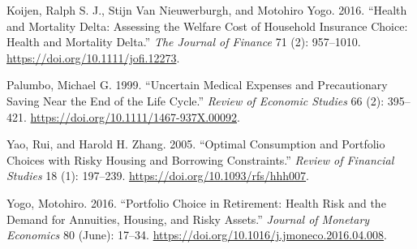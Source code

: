 \documentclass[
  12pt,
]{article}
\newlength{\cslhangindent}
\newlength{\cslentryspacingunit} %
\newenvironment{CSLReferences}[2] %
 {%
  \setlength{\parindent}{0pt}
  \ifodd #1
  \let\oldpar\par
  \def\par{\hangindent=\cslhangindent\oldpar}
  \fi
  \setlength{\parskip}{#2\cslentryspacingunit}
 }%
 {}
\begin{document}
\begin{CSLReferences}{1}{0}
\leavevmode{}%
Koijen, Ralph S. J., Stijn Van Nieuwerburgh, and Motohiro Yogo. 2016.
{``Health and Mortality Delta: Assessing the Welfare Cost of Household
Insurance Choice: Health and Mortality Delta.''} \emph{The Journal of
Finance} 71 (2): 957--1010. \url{https://doi.org/10.1111/jofi.12273}.

\leavevmode{}%
Palumbo, Michael G. 1999. {``Uncertain Medical Expenses and
Precautionary Saving Near the End of the Life Cycle.''} \emph{Review of
Economic Studies} 66 (2): 395--421.
\url{https://doi.org/10.1111/1467-937X.00092}.

\leavevmode{}%
Yao, Rui, and Harold H. Zhang. 2005. {``Optimal Consumption and
Portfolio Choices with Risky Housing and Borrowing Constraints.''}
\emph{Review of Financial Studies} 18 (1): 197--239.
\url{https://doi.org/10.1093/rfs/hhh007}.

\leavevmode{}%
Yogo, Motohiro. 2016. {``Portfolio Choice in Retirement: Health Risk and
the Demand for Annuities, Housing, and Risky Assets.''} \emph{Journal of
Monetary Economics} 80 (June): 17--34.
\url{https://doi.org/10.1016/j.jmoneco.2016.04.008}.

\end{CSLReferences}
\end{document}
